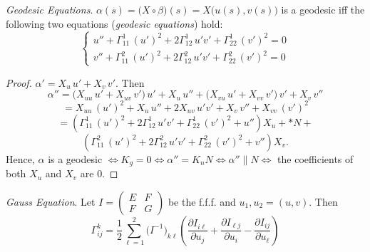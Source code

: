 \begin{theorem}
\textit{Geodesic Equations}. $\alpha(s) = \big(X\circ\beta\big)(s) = X\big(u(s), v(s)\big)$ is a geodesic iff the following two equations (\textit{geodesic equations}) hold:
\[
\begin{cases}
u'' + \Gamma_{11}^1\,(u')^2 + 2\Gamma_{12}^1\,u'v' + \Gamma_{22}^1\,(v')^2 = 0\\[2mm]
v'' + \Gamma_{11}^2\,(u')^2 + 2\Gamma_{12}^2\,u'v' + \Gamma_{22}^2\,(v')^2 = 0
\end{cases}
\]
\end{theorem}

\begin{proof}
$\alpha' = X_u\,u' + X_v\,v'$. Then
\[
\alpha'' = \big(X_{uu}\,u' + X_{uv}\,v'\big)\,u' + X_u\,u'' + \big(X_{vu}\,u' + X_{vv}\,v'\big)\,v' + X_v\,v''
\]
\[
= X_{uu}\,(u')^2 + X_u\,u'' + 2X_{uv}\,u'v' + X_v\,v'' + X_{vv}\,(v')^2
\]
\[
= \left(\Gamma_{11}^1\,(u')^2 + 2\Gamma_{12}^1\,u'v' + \Gamma_{22}^1\,(v')^2 + u''\right)X_u + *N +
\]
\[
\left(\Gamma_{11}^2\,(u')^2 + 2\Gamma_{12}^2\,u'v' + \Gamma_{22}^2\,(v')^2 + v''\right)X_v.
\]
Hence, $\alpha$ is a geodesic $\iff K_g = 0 \iff \alpha'' = K_nN \iff \alpha''\parallel N \iff$ the coefficients of both $X_u$ and $X_v$ are 0.
\end{proof}

\begin{theorem}
\textit{Gauss Equation}. Let $I = \begin{pmatrix}E & F\\ F & G\end{pmatrix}$ be the f.f.f. and $u_1, u_2 = (u, v)$. Then
\[
\Gamma_{ij}^k = \frac{1}{2}\sum_{\ell=1}^{2}\big(I^{-1}\big)_{k\ell}\left(\frac{\partial I_{i\ell }}{\partial u_j} + \frac{\partial I_{\ell j}}{\partial u_i} - \frac{\partial I_{ij}}{\partial u_\ell}\right)
\]
\end{theorem}

